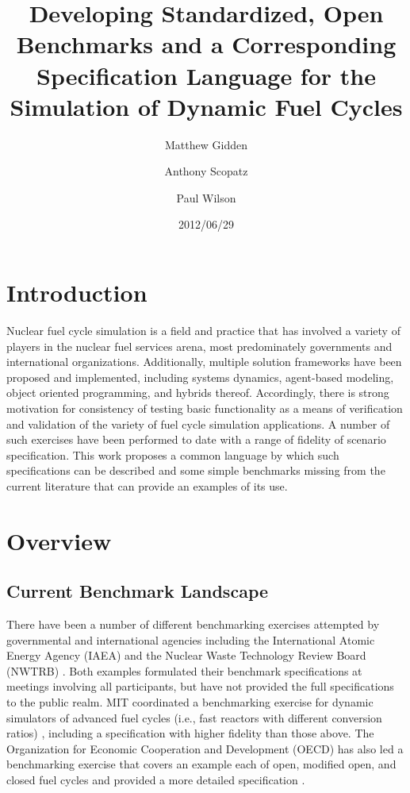 \documentclass{anstrans}
\title{Developing Standardized, Open Benchmarks and a Corresponding 
Specification Language for the Simulation of Dynamic Fuel Cycles}
\author[*]{Matthew Gidden}
\author[$\dag$]{Anthony Scopatz}
\author[*]{Paul Wilson}
\affil[*]{Department of Nuclear Engineering \& Engineering Physics, 
University of Wisconsin - Madison, Madison, WI, 53703}
\affil[$\dag$]{The Flash Center for Computational Science, University 
of Chicago, Chicago, IL, 60637}
\date{2012/06/29}
\begin{document}
\section{Introduction}
Nuclear fuel cycle simulation is a field and practice that has involved a
variety of players in the nuclear fuel services arena, most predominately
governments and international organizations.  Additionally, multiple solution
frameworks have been proposed and implemented, including systems dynamics,
agent-based modeling, object oriented programming, and hybrids
thereof. Accordingly, there is strong motivation for consistency of testing
basic functionality as a means of verification and validation of the variety of
fuel cycle simulation applications. A number of such exercises have been
performed to date with a range of fidelity of scenario specification. This work
proposes a common language by which such specifications can be described and
some simple benchmarks missing from the current literature that can provide an
examples of its use.

\section{Overview}

\subsection{Current Benchmark Landscape}
There have been a number of different benchmarking exercises attempted by
governmental and international agencies including the International Atomic
Energy Agency (IAEA) \cite{_international_2011} and the Nuclear Waste Technology
Review Board (NWTRB) \cite{_nuclear_2011}.  Both examples formulated their
benchmark specifications at meetings involving all participants, but have not
provided the full specifications to the public realm. MIT coordinated a
benchmarking exercise for dynamic simulators of advanced fuel cycles (i.e., fast
reactors with different conversion ratios) \cite{guerin_benchmark_2009},
including a specification with higher fidelity than those above. The
Organization for Economic Cooperation and Development (OECD) has also led a
benchmarking exercise that covers an example each of open, modified open, and
closed fuel cycles \cite{boucher_benchmark_2012} and provided a more detailed
specification \cite{boucher_specification_2008}.
\end{document}
